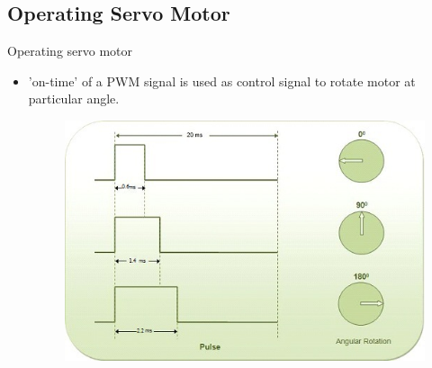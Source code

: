 \documentclass[table,10pt,red]{beamer}	%
\begin{document}
\subsection{Operating Servo Motor}
\begin{frame}{Operating servo motor}
	\begin{itemize}
		
		
		\item
		'on-time' of a PWM signal is used as control signal to rotate motor at particular angle.\\
		
		\begin{figure}
			\includegraphics[width=0.8\linewidth]{"pwm signal"}
		\end{figure}
	\end{itemize}
\end{frame}		
\end{document}
